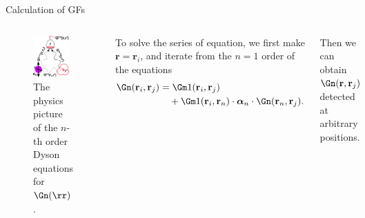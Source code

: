 \documentclass{beamer}
\begin{document}
\begin{frame}{Calculation of GFs}
\begin{columns}
\begin{figure}[h]%
\centering
\begin{center}
\includegraphics[width=0.9\textwidth]{./Figs/GnDetection}%
\end{center}
\caption[The physics picture of Dyson equations.]{The physics picture of the $n$-th order Dyson equations for $\Gn(\rr)$. }
\end{figure}
To solve the series of equation, we first make $\mathbf{r}=\mathbf{r}_i$, and iterate from the $n=1$ order of the equations
\begin{align}
\Gn(\mathbf{r}_i,\mathbf{r}_j) &=\Gm1(\mathbf{r}_i,\mathbf{r}_j)\nonumber \\ 
&\quad +{\Gm1(\mathbf{r}_i,\mathbf{r}_n)\cdot {\bm \alpha}_n\cdot \Gn(\mathbf{r}_n,\mathbf{r}_j)}.\nonumber
\end{align}

Then we can obtain $\Gn(\mathbf{r},\mathbf{r}_j)$ detected at arbitrary positions.
\end{columns}
\end{frame}
\end{document}
